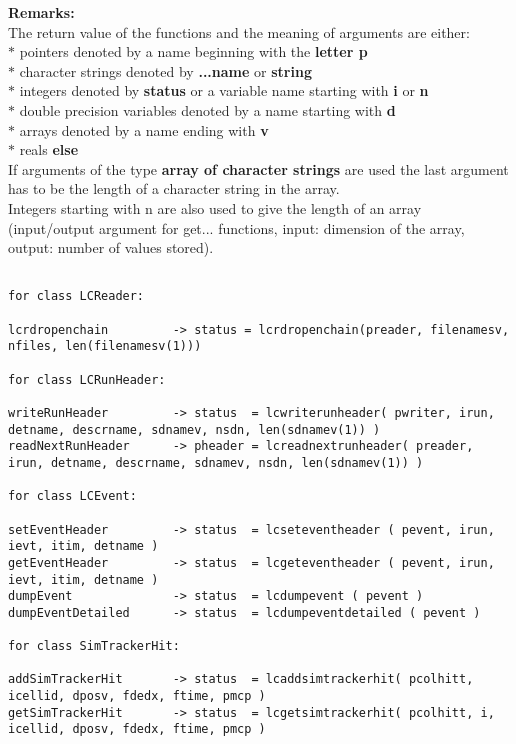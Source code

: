 \begin{scriptsize}

{\bf Remarks:} \\

The return value of the functions and the meaning of arguments are either: \\
$*$ pointers denoted by a name beginning with the {\bf letter p} \\
$*$ character strings denoted by {\bf ...name} or {\bf string} \\
$*$ integers  denoted by {\bf status} or a variable name starting with {\bf i} or {\bf n} \\
$*$ double precision variables denoted by a name starting with {\bf d} \\
$*$ arrays denoted by a name ending with {\bf v} \\
$*$ reals {\bf else} \\
If arguments of the type {\bf array of character strings} are used the last
argument has to be the length of a character string in the array.   \\
Integers starting with n are also used to give the length of an array 
(input/output argument for get... functions, input: dimension of the array, output: number of values stored).


\begin{verbatim}

for class LCReader:

lcrdropenchain         -> status = lcrdropenchain(preader, filenamesv, nfiles, len(filenamesv(1)))

for class LCRunHeader:

writeRunHeader         -> status  = lcwriterunheader( pwriter, irun, detname, descrname, sdnamev, nsdn, len(sdnamev(1)) )
readNextRunHeader      -> pheader = lcreadnextrunheader( preader, irun, detname, descrname, sdnamev, nsdn, len(sdnamev(1)) )

for class LCEvent:

setEventHeader         -> status  = lcseteventheader ( pevent, irun, ievt, itim, detname )
getEventHeader         -> status  = lcgeteventheader ( pevent, irun, ievt, itim, detname )
dumpEvent              -> status  = lcdumpevent ( pevent )
dumpEventDetailed      -> status  = lcdumpeventdetailed ( pevent )

for class SimTrackerHit:

addSimTrackerHit       -> status  = lcaddsimtrackerhit( pcolhitt, icellid, dposv, fdedx, ftime, pmcp )
getSimTrackerHit       -> status  = lcgetsimtrackerhit( pcolhitt, i, icellid, dposv, fdedx, ftime, pmcp )


\end{verbatim}
\end{scriptsize}
